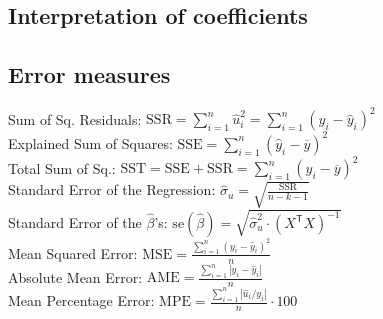 \documentclass[10pt, a4paper, landscape]{extarticle}
\newcommand{\se}{\mathrm{se}}
\newcommand{\SSR}{\mathrm{SSR}}
\newcommand{\SSE}{\mathrm{SSE}}
\newcommand{\SST}{\mathrm{SST}}
\newcommand{\tr}{\mathsf{T}}
\begin{document}
\begin{multicols}{3}
	\subsection*{Interpretation of coefficients}
		\begin{center}
		\end{center}		
	\subsection*{Error measures}
		Sum of Sq. Residuals: \hfill $\SSR = \sum_{i=1}^n \hat{u}_i^2 = \sum_{i=1}^n (y_i - \hat{y}_i)^2$ \\
		Explained Sum of Squares: \hfill $\SSE = \sum_{i=1}^n (\hat{y}_i - \overline{y})^2$ \\
		Total Sum of Sq.: \hfill $\SST = \SSE + \SSR = \sum_{i=1}^n (y_i - \overline{y})^2$ \\
		Standard Error of the Regression: \hfill $\hat{\sigma}_u = \sqrt{\frac{\SSR}{n-k-1}}$ \\
		Standard Error of the $\hat{\beta}$'s: \hfill $\se(\hat{\beta}) = \sqrt{\hat{\sigma}^2_u \cdot (X^\tr X)^{-1}}$ \\
		Mean Squared Error: \hfill $\mathrm{MSE} = \frac{\sum_{i=1}^n (y_i - \hat{y}_i)^2}{n}$ \\
		Absolute Mean Error: \hfill $\mathrm{AME} = \frac{\sum_{i=1}^n |y_i - \hat{y}_i|}{n}$ \\
		Mean Percentage Error: \hfill $\mathrm{MPE} = \frac{\sum_{i=1}^n |\hat{u}_i / y_i|}{n} \cdot 100$
\columnbreak

\end{multicols}
\end{document}
